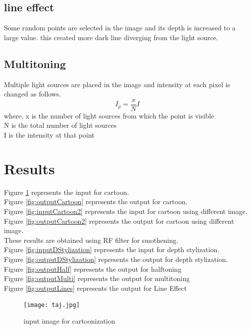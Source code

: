\documentclass[conference]{IEEEtran}
\begin{document}
  \subsection{line effect}
   Some random points are selected in the image and its depth is increased to a large value. this created more dark line diverging from the light source.
   
   \subsection{Multitoning}
   Multiple light sources are placed in the image and intensity at each pixel is changed as follows.
   $$I_p = \frac{x}{N}I$$
   where, x is the number of light sources from which the point is visible\\
   N is the total number of light sources\\
   I is the intensity at that point\\ 
 
 \section{Results}
 Figure \ref{fig:inputCartoon} represents the input for cartoon.\\
 Figure \ref{fig:outputCartoon} represents the output for cartoon.\\
  Figure \ref{fig:inputCartoon2} represents the input for cartoon using different image.\\
 Figure \ref{fig:outputCartoon2} represents the output for cartoon using different image.\\
 These results are obtained using RF filter for smothening. \\
 Figure \ref{fig:inputDStylization} represents the input for depth stylization.\\
  Figure \ref{fig:outputDStylization} represents the output for depth stylization.\\
  Figure \ref{fig:outputHalf} represents the output for halftoning\\
 Figure \ref{fig:outputMulti} represents the output for multitoning\\
 Figure \ref{fig:outputLines} represents the output for Line Effect\\
 
 
 
 \begin{figure}
 	\texttt{[image: taj.jpg]}
 	\caption{input image for cartoonization}
 	\label{fig:inputCartoon}
 \end{figure}
\end{document}
